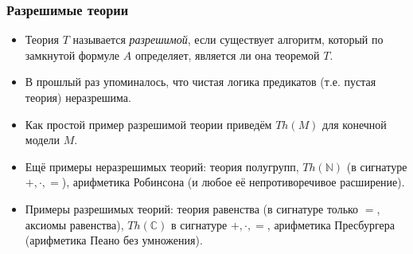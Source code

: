 \documentclass[10pt]{beamer}
\begin{document}
\begin{frame}
    \frametitle{Разрешимые теории}
    \begin{itemize}
        \item Теория $T$ называется \emph{разрешимой}, если существует алгоритм, который по замкнутой формуле $A$ определяет, является ли она теоремой $T$.
        \item В прошлый раз упоминалось, что чистая логика предикатов (т.е. пустая теория) неразрешима.
        \item Как простой пример разрешимой теории приведём $Th(M)$ для конечной модели $M$.
        \item Ещё примеры неразрешимых теорий: теория полугрупп, $Th(\mathbb{N})$ (в сигнатуре $+,\cdot,=$), арифметика Робинсона (и любое её непротиворечивое расширение).
        \item Примеры разрешимых теорий: теория равенства (в сигнатуре только $=$, аксиомы равенства), $Th(\mathbb{C})$ в сигнатуре $+,\cdot,=$, арифметика Пресбургера (арифметика Пеано без умножения).
    \end{itemize}
\end{frame}
\end{document}

